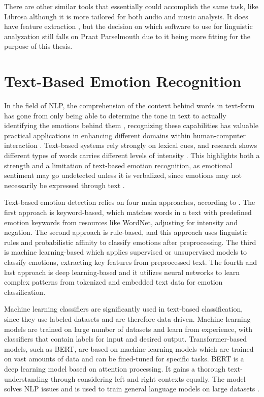There are other similar tools that essentially could accomplish the same task, like Librosa although it is more tailored for both audio and music analysis. It does have feature extraction \autocite{Babu2021}, but the decision on which software to use for linguistic analyzation still falls on Praat Parselmouth due to it being more fitting for the purpose of this thesis.

\section{Text-Based Emotion Recognition}
In the field of NLP, the comprehension of the context behind words in text-form has gone from only being able to determine the tone in text to actually identifying the emotions behind them \autocite{Esfahani2024}, recognizing these capabilities has valuable practical applications in enhancing different domains within human-computer interaction \autocite{Shelke2022}. 
Text-based systems rely strongly on lexical cues, and research shows different types of words carries different levels of intensity \autocite{Chauhan2024}. This highlights both a strength and a limitation of text-based emotion recognition, as emotional sentiment may go undetected unless it is verbalized, since emotions may not necessarily be expressed through text \autocite{Soleymani2017}.

Text-based emotion detection relies on four main approaches, according to \textcite{Kusal2023}.
The first approach is keyword-based, which matches words in a text with predefined emotion keywords from resources like WordNet, adjusting for intensity and negation. The second approach is rule-based, and this approach uses linguistic rules and probabilistic affinity to classify emotions after preprocessing. The third is machine learning-based which applies supervised or unsupervised models to classify emotions, extracting key features from preprocessed text. The fourth and last approach is deep learning-based and it utilizes neural networks to learn complex patterns from tokenized and embedded text data for emotion classification.

Machine learning classifiers are significantly used in text-based classification, since they use labeled datasets and are therefore data driven. Machine learning models are trained on large number of datasets and learn from experience, with classifiers that contain labels for input and desired output. Transformer-based models, such as BERT, are based on machine learning models which are trained on vast amounts of data and can be fined-tuned for specific tasks. BERT is a deep learning model based on attention processing. It gains a thorough text-understanding through considering left and right contexts equally. The model solves NLP issues and is used to train general language models on large datasets \autocite{Kusal2024}.

